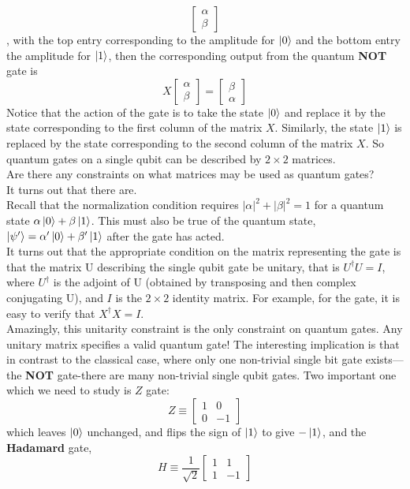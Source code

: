 \documentclass{article}
\begin{document}
\begin{equation}
\begin{bmatrix}
    \alpha \\ \beta
\end{bmatrix} 
\end{equation},
with the top entry corresponding to the amplitude for $\ket{0}$ and the bottom entry the amplitude for $\ket{1}$, then the corresponding output from the quantum \textbf{NOT} gate is 
\begin{equation}
    X\begin{bmatrix}
        \alpha \\ \beta
    \end{bmatrix} = \begin{bmatrix}
        \beta \\ \alpha
    \end{bmatrix}
\end{equation}
Notice that the action of the gate is to take the state $\ket{0}$ and replace it by the state
corresponding to the first column of the matrix $X$. Similarly, the state $\ket{1}$ is replaced by the state corresponding to the second column of the matrix $X$. So quantum gates on a single qubit can be described by $2 \times 2$ matrices.\\
Are there
any constraints on what matrices may be used as quantum gates?\\
It turns out that there are.\\
Recall that the normalization condition requires $|\alpha|^{2}+|\beta|^{2} = 1$ for a quantum state
$\alpha\ket{0} + \beta\ket{1}$. This must also be true of the quantum state, $\ket{\psi'}=\alpha'\ket{0} + \beta'\ket{1}$ after the
gate has acted. \\
It turns out that the appropriate condition on the matrix representing the gate is that the matrix U describing the single qubit gate be unitary, that is $U^{\dagger}U = I$,
where $U^{\dagger}$ is the adjoint of U (obtained by transposing and then complex conjugating U), and $I$ is the $2 \times 2$ identity matrix. For example, for the gate, it is easy to
verify that $X^{\dagger}X=I$.\\
Amazingly, this unitarity constraint is the only constraint on quantum gates. Any unitary matrix specifies a valid quantum gate! The interesting implication is that in contrast to the classical case, where only one non-trivial single bit gate exists—the \textbf{NOT} gate-there are many non-trivial single qubit gates. Two important one which we need to study is $Z$ gate:
\begin{equation}
    Z \equiv \begin{bmatrix}
        1 & 0 \\ 0 & -1
    \end{bmatrix}
\end{equation}
which leaves $\ket{0}$ unchanged, and flips the sign of $\ket{1}$ to give $-\ket{1}$, and the \textbf{Hadamard} gate,
\begin{equation}
    H \equiv \frac{1}{\sqrt{2}}\begin{bmatrix}
        1 & 1 \\ 1 & -1
    \end{bmatrix}
\end{equation}
\end{document}
